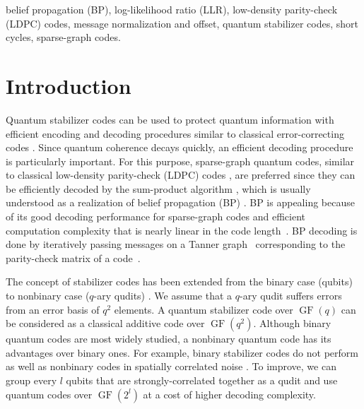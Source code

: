 \documentclass{ieeeaccess}
\DeclareMathOperator{\GF}{GF}
\theoremstyle{definition}		%
\begin{document}
\begin{keywords}
belief propagation (BP), log-likelihood ratio (LLR), low-density parity-check (LDPC) codes, message normalization and offset, quantum stabilizer codes, short cycles, sparse-graph codes.
\end{keywords}

\titlepgskip=-15pt

\maketitle
 

\section{Introduction} \label{sec:Intro}
Quantum stabilizer codes can be used to protect quantum information with efficient encoding and decoding procedures similar to classical error-correcting codes \cite{Shor95,CS96,Steane96,GotPhD,CRSS98,NC00}. 
Since quantum coherence decays quickly, an efficient decoding procedure is particularly important.
For this purpose, sparse-graph quantum codes, similar to classical low-density parity-check (LDPC) codes \cite{Gal63,MN96,Mac99}, are preferred since they can be efficiently decoded by the sum-product algorithm  \mbox{\cite{MMM04, PC08,Wan+12,Bab+15,ROJ19,PK19,KL20, RWBC20 ,LP19}},
which is usually understood as a realization of belief propagation (BP) \cite{Pea88}. 
BP is appealing because  of   its good decoding performance for sparse-graph codes and efficient computation complexity that  is nearly linear in the code length~\cite{Gal63,MN96,Mac99}.
BP decoding is done by iteratively passing messages on a Tanner graph~\cite{Tan81} corresponding to the parity-check matrix of a code~\cite{WLK95,MMC98,AM00,KFL01,RU08}. %



The concept of stabilizer codes has been extended from the binary case (qubits) to nonbinary case ($q$-ary qudits) \cite{Kni96a,Kni96b,Rai99,MU00,AK01,KKKS06}.
We assume that a $q$-ary qudit  suffers errors from an error basis of $q^2$ elements.
A quantum stabilizer code over $\GF(q)$ can be considered as a classical additive code over $\GF(q^2)$.
Although binary quantum codes are most widely studied, a nonbinary quantum code has its advantages over binary ones. 
For example, binary stabilizer codes do not perform as well as nonbinary codes in spatially correlated noise \cite{KF05,NB06}.
To improve, we can group every $l$ qubits that are strongly-correlated together as a qudit and use quantum codes over $\GF(2^l)$
at a cost of higher decoding complexity. %
\end{document}
